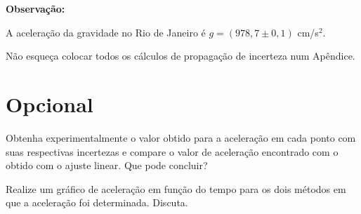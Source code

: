 {\bf Observação:}
\vspace{-0.5cm}
\begin{iten}
\item A aceleração da gravidade no Rio de Janeiro é $g = (978,7 \pm 0,1)$ cm/s$^2$.  
\item Não esqueça colocar todos os cálculos de propagação de incerteza num Apêndice. 
\end{iten}


\vspace{-0.7cm}
\section*{Opcional}

\begin{num}
\item Obtenha experimentalmente o valor obtido para a aceleração em cada ponto com suas respectivas incertezas e compare o valor de aceleração encontrado com o obtido com o ajuste linear.  Que pode concluir?
\item Realize um gráfico de aceleração em função do tempo para os dois métodos em que a aceleração foi determinada. Discuta.
\end{num}




